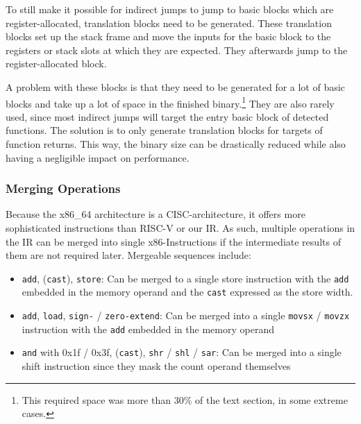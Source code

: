 \documentclass[course=eragp]{aspdoc}
\begin{document}
\par

To still make it possible for indirect jumps to jump to basic blocks which are register-allocated,
translation blocks need to be generated.
These translation blocks set up the stack frame and move the inputs for the basic block to the
registers or stack slots at which they are expected.
They afterwards jump to the register-allocated block.

\par

A problem with these blocks is that they need to be generated for a lot of basic blocks and take up
a lot of space in the finished binary.\footnote{This required space was more than 30\% of the
    \.text section, in some extreme cases.}
They are also rarely used, since most indirect jumps will target the entry basic block of detected
functions.
The solution is to only generate translation blocks for targets of function returns. This way, the binary size can be
drastically reduced while also having a negligible impact on performance.

\subsubsection{Merging Operations}
Because the x86\_64 architecture is a CISC-architecture, it offers more sophisticated
instructions than RISC-V or our IR. As such, multiple operations in the IR can be merged
into single x86-Instructions if the intermediate results of them are not required later.
Mergeable sequences include:
\begin{itemize}
    \item \texttt{add}, (\texttt{cast}), \texttt{store}: Can be merged to a single store instruction with the
          \texttt{add} embedded in the memory operand and the \texttt{cast} expressed as the store width.
    \item \texttt{add}, \texttt{load}, \texttt{sign-} / \texttt{zero-extend}: Can be merged into a
          single \texttt{movsx} / \texttt{movzx} instruction with the \texttt{add} embedded in the memory operand
    \item \texttt{and} with 0x1f / 0x3f, (\texttt{cast}), \texttt{shr} / \texttt{shl} / \texttt{sar}:
          Can be merged into a single shift instruction since they mask the count operand themselves
\end{itemize}
\end{document}
